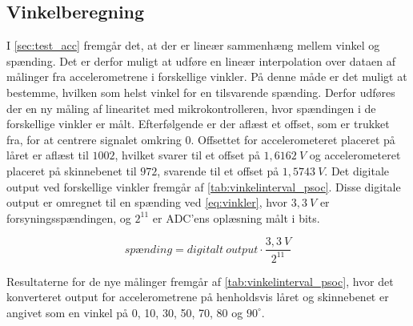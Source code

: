 \subsection{Vinkelberegning}\label{sec:imp_vinkler}
I \autoref{sec:test_acc} fremgår det, at der er lineær sammenhæng mellem vinkel og spænding. Det er derfor muligt at udføre en lineær interpolation over dataen af målinger fra accelerometrene i forskellige vinkler. På denne måde er det muligt at bestemme, hvilken som helst vinkel for en tilsvarende spænding. 
Derfor udføres der en ny måling af linearitet med mikrokontrolleren, hvor spændingen i de forskellige vinkler er målt. Efterfølgende er der aflæst et offset, som er trukket fra, for at centrere signalet omkring 0. Offsettet for accelerometeret placeret på låret er aflæst til $1002$, hvilket svarer til et offset på $1,6162~V$ og accelerometeret placeret på skinnebenet til $972$, svarende til et offset på $1,5743~V$. Det digitale output ved forskellige vinkler fremgår af \autoref{tab:vinkelinterval_psoc}. Disse digitale output er omregnet til en spænding ved \autoref{eq:vinkler}, hvor $3,3~V$ er forsyningsspændingen, og $2^{11}$ er ADC'ens oplæsning målt i bits.  

\begin{equation}
\label{eq:vinkler}
sp\text{æ}nding =digitalt~output\cdot \dfrac{3,3~V}{2^{11}}
\end{equation}

\noindent
Resultaterne for de nye målinger fremgår af \autoref{tab:vinkelinterval_psoc}, hvor det konverteret output for accelerometrene på henholdsvis låret og skinnebenet er angivet som en vinkel på 0, 10, 30, 50, 70, 80 og $90^{\circ}.$ 


